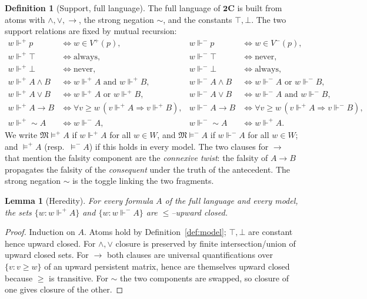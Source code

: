\documentclass{amsart}
\theoremstyle{plain}
\newtheorem{lemma}[theorem]{Lemma}
\theoremstyle{definition}
\newtheorem{definition}[theorem]{Definition}
\newcommand{\To}{\rightarrow}
\newcommand{\bigC}{\mathbf{2C}}
\newcommand{\fp}{\Vdash^{+}}
\newcommand{\fm}{\Vdash^{-}}
\begin{document}
\begin{definition}[Support, full language]\label{def:support}
The full language of $\bigC$ is built from atoms with
$\wedge,\vee,\To$, the strong negation ${\sim}$, and the constants
$\top,\bot$. The two support relations are fixed by mutual recursion:
\begin{align*}
w\fp p &\iff w\in V^{+}(p), & w\fm p &\iff w\in V^{-}(p),\\
w\fp \top &\iff \text{always}, & w\fm \top &\iff \text{never},\\
w\fp \bot &\iff \text{never}, & w\fm \bot &\iff \text{always},\\
w\fp A\wedge B &\iff w\fp A \text{ and } w\fp B,
 & w\fm A\wedge B &\iff w\fm A \text{ or } w\fm B,\\
w\fp A\vee B &\iff w\fp A \text{ or } w\fp B,
 & w\fm A\vee B &\iff w\fm A \text{ and } w\fm B,\\
w\fp A\To B &\iff \forall v\ge w\,(v\fp A\Rightarrow v\fp B),
 & w\fm A\To B &\iff \forall v\ge w\,(v\fp A\Rightarrow v\fm B),\\
w\fp {\sim}A &\iff w\fm A, & w\fm {\sim}A &\iff w\fp A .
\end{align*}
We write $\mathfrak{M}\models^{+}A$ if $w\fp A$ for all $w\in W$, and
$\mathfrak{M}\models^{-}A$ if $w\fm A$ for all $w\in W$; and $\models^{+}A$
(resp.\ $\models^{-}A$) if this holds in every model. The two clauses for
$\To$ that mention the falsity component are the \emph{connexive twist}: the
falsity of $A\To B$ propagates the falsity of the \emph{consequent} under the
truth of the antecedent. The strong negation ${\sim}$ is the toggle linking the
two fragments.
\end{definition}

\begin{lemma}[Heredity]\label{lem:hered}
For every formula $A$ of the full language and every model, the sets
$\{w: w\fp A\}$ and $\{w: w\fm A\}$ are $\le$--upward closed.
\end{lemma}
\begin{proof}
Induction on $A$. Atoms hold by Definition~\ref{def:model}; $\top,\bot$ are
constant hence upward closed. For $\wedge,\vee$ closure is preserved by finite
intersection/union of upward closed sets. For $\To$ both clauses are universal
quantifications over $\{v:v\ge w\}$ of an upward persistent matrix, hence are
themselves upward closed because $\ge$ is transitive. For ${\sim}$ the two
components are swapped, so closure of one gives closure of the other.
\end{proof}
\end{document}
